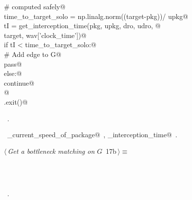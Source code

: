 \documentclass[10pt, english, oneside]{report}
\begin{document}
\begin{flushleft}
\begin{minipage}{\linewidth}
\begin{list}{}{}
\mbox{}\verb@                            # computed safely@\\
\mbox{}\verb@             time_to_target_solo = np.linalg.norm((target-pkg))/ upkg@\\
\mbox{}\verb@             tI                  = get_interception_time(pkg, upkg, dro, udro, @\\
\mbox{}\verb@                                                         target, wav['clock_time'])@\\
\mbox{}\verb@             if tI < time_to_target_solo:@\\
\mbox{}\verb@                   # Add edge to G@\\
\mbox{}\verb@                   pass@\\
\mbox{}\verb@          else:@\\
\mbox{}\verb@              continue@\\
\mbox{}\verb@    @\\
\mbox{}\verb@sys.exit()@\\
\mbox{}\verb@@{\NWsep}
\end{list}
\vspace{-1.5ex}
\footnotesize
\begin{list}{}{\setlength{\itemsep}{-\parsep}\setlength{\itemindent}{-\leftmargin}}
\item \NWtxtMacroRefIn\ .
\item \NWtxtIdentsUsed\nobreak\  \verb@get_current_speed_of_package@\nobreak\ , \verb@get_interception_time@\nobreak\ .
\item{}
\end{list}
\end{minipage}\vspace{4ex}
\end{flushleft}

\begin{flushleft} \small
\begin{minipage}{\linewidth}\label{scrap17}\raggedright\small
{} $\langle\,${\itshape Get a bottleneck matching on $G$}\nobreak\ {\footnotesize {17b}}$\,\rangle\equiv$
\vspace{-1ex}
\begin{list}{}{} \item
\mbox{}\verb@@\\
\mbox{}\verb@pass@\\
\mbox{}\verb@@{\NWsep}
\end{list}
\vspace{-1.5ex}
\footnotesize
\begin{list}{}{\setlength{\itemsep}{-\parsep}\setlength{\itemindent}{-\leftmargin}}
\item \NWtxtMacroRefIn\ .

\item{}
\end{list}
\end{minipage}\vspace{4ex}
\end{flushleft}
\end{document}
